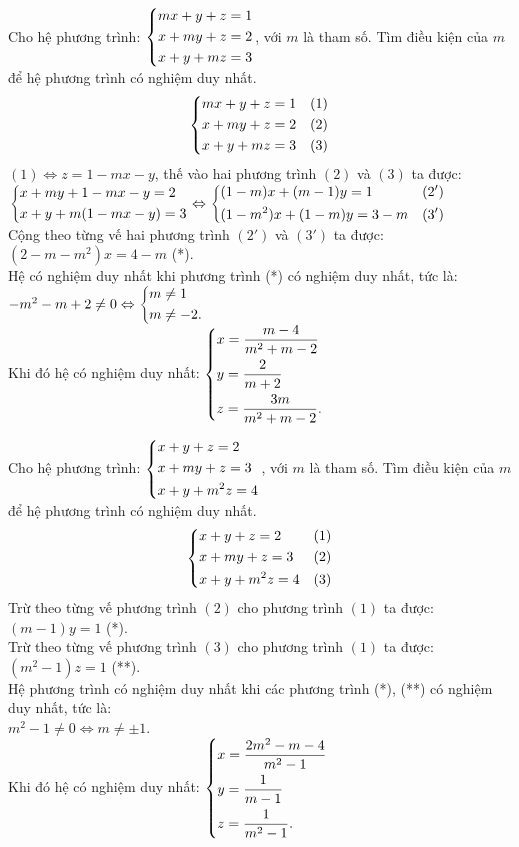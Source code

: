 \begin{ex}%
 Cho hệ phương trình: $\left\{\begin{aligned}& mx+y+z=1 \\& x+my+z=2 \\& x+y+mz=3\end{aligned}\right.$, với $m$ là tham số. Tìm điều kiện của $m$ để hệ phương trình có nghiệm duy nhất.
 \loigiai
  {
  $$\left\{\begin{aligned}& mx+y+z=1 & (1) \\& x+my+z=2 & (2) \\& x+y+mz=3 & (3)\end{aligned}\right.$$
  $(1) \Leftrightarrow z = 1-mx-y$, thế vào hai phương trình $(2)$ và $(3)$ ta được:\\
  $\left\{\begin{aligned}& x+my+1-mx-y=2 \\& x+y+m(1-mx-y)=3\end{aligned}\right. \Leftrightarrow \left\{\begin{aligned}& (1-m)x + (m-1)y = 1 & (2') \\& (1-m^2)x + (1-m)y = 3-m & (3')\end{aligned}\right.$\\
  Cộng theo từng vế hai phương trình $(2')$ và $(3')$ ta được: $(2-m-m^2)x = 4-m$ (*).\\
  Hệ có nghiệm duy nhất khi phương trình (*) có nghiệm duy nhất, tức là:\\
  $-m^2-m+2 \neq 0 \Leftrightarrow \left\{\begin{aligned}& m \neq 1 \\& m \neq -2.\end{aligned}\right.$\\
  Khi đó hệ có nghiệm duy nhất: $\left\{\begin{aligned}& x = \dfrac{m-4}{m^2+m-2} \\& y = \dfrac{2}{m+2} \\& z = \dfrac{3m}{m^2+m-2}.\end{aligned}\right.$
  }
\end{ex}


\begin{ex}%
 Cho hệ phương trình: $\left\{\begin{aligned}& x+y+z=2 \\& x+my+z=3 \\& x+y+m^2z=4\end{aligned}\right.$, với $m$ là tham số. Tìm điều kiện của $m$ để hệ phương trình có nghiệm duy nhất.
 \loigiai
  {
  $$\left\{\begin{aligned}& x+y+z=2 & (1) \\& x+my+z=3 & (2) \\& x+y+m^2z=4 & (3)\end{aligned}\right.$$
  Trừ theo từng vế phương trình $(2)$ cho phương trình $(1)$ ta được: $(m-1)y = 1$ (*).\\
  Trừ theo từng vế phương trình $(3)$ cho phương trình $(1)$ ta được: $(m^2-1)z = 1$ (**).\\
  Hệ phương trình có nghiệm duy nhất khi các phương trình (*), (**) có nghiệm duy nhất, tức là:\\
  $m^2 - 1 \neq 0 \Leftrightarrow m \neq \pm 1$.\\
  Khi đó hệ có nghiệm duy nhất: $\left\{\begin{aligned}& x = \dfrac{2m^2-m-4}{m^2-1} \\& y = \dfrac{1}{m-1} \\& z = \dfrac{1}{m^2-1}.\end{aligned}\right.$
  }
\end{ex}


